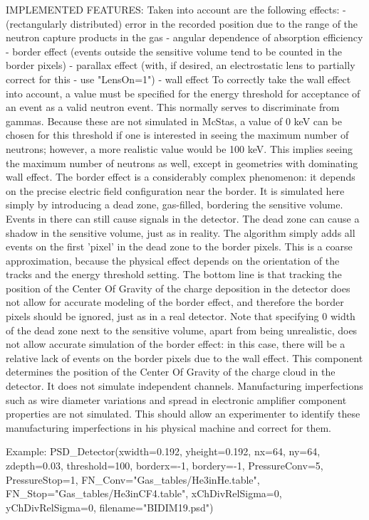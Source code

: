IMPLEMENTED FEATURES: Taken into account are the following effects: - (rectangularly distributed) error in the recorded position due to the range of the neutron capture products in the gas - angular dependence of absorption efficiency - border effect (events outside the sensitive volume tend to be counted in the border pixels) - parallax effect (with, if desired, an electrostatic lens to partially correct for this - use "LensOn=1") - wall effect To correctly take the wall effect into account, a value must be specified for the energy threshold for acceptance of an event as a valid neutron event. This normally serves to discriminate from gammas. Because these are not simulated in McStas, a value of 0 keV can be chosen for this threshold if one is interested in seeing the maximum number of neutrons; however, a more realistic value would be 100 keV. This implies seeing the maximum number of neutrons as well, except in geometries with dominating wall effect. The border effect is a considerably complex phenomenon: it depends on the precise electric field configuration near the border. It is simulated here simply by introducing a dead zone, gas-filled, bordering the sensitive volume. Events in there can still cause signals in the detector. The dead zone can cause a shadow in the sensitive volume, just as in reality. The algorithm simply adds all events on the first 'pixel' in the dead zone to the border pixels. This is a coarse approximation, because the physical effect depends on the orientation of the tracks and the energy threshold setting. The bottom line is that tracking the position of the Center Of Gravity of the charge deposition in the detector does not allow for accurate modeling of the border effect, and therefore the border pixels should be ignored, just as in a real detector. Note that specifying 0 width of the dead zone next to the sensitive volume, apart from being unrealistic, does not allow accurate simulation of the border effect: in this case, there will be a relative lack of events on the border pixels due to the wall effect. This component determines the position of the Center Of Gravity of the charge cloud in the detector. It does not simulate independent channels. Manufacturing imperfections such as wire diameter variations and spread in electronic amplifier component properties are not simulated. This should allow an experimenter to identify these manufacturing imperfections in his physical machine and correct for them.

Example: PSD\_Detector(xwidth=0.192, yheight=0.192, nx=64, ny=64, zdepth=0.03, threshold=100, borderx=-1, bordery=-1, PressureConv=5, PressureStop=1, FN\_Conv="Gas\_tables/He3inHe.table", FN\_Stop="Gas\_tables/He3inCF4.table", xChDivRelSigma=0, yChDivRelSigma=0, filename="BIDIM19.psd")

